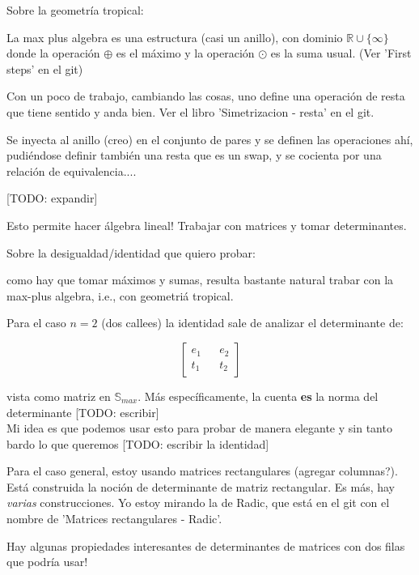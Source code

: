 \documentclass[10pt,a4paper]{report}
\begin{document}
Sobre la geometría tropical:

La max plus algebra es una estructura (casi un anillo), con dominio $\mathbb{R} \cup \{\infty\}$donde la operación $\oplus$ es el máximo y la operación $\odot$ es la suma usual. (Ver 'First steps' en el git)

Con un poco de trabajo, cambiando las cosas, uno define una operación de resta que tiene sentido y anda bien. Ver el libro 'Simetrizacion - resta' en el git.

Se inyecta al anillo (creo) en el conjunto de pares y se definen las operaciones ahí, pudiéndose definir también una resta que es un swap, y se cocienta por una relación de equivalencia....

[TODO: expandir]


Esto permite hacer álgebra lineal! Trabajar con matrices y tomar determinantes.



Sobre la desigualdad/identidad que quiero probar:

como hay que tomar máximos y sumas, resulta bastante natural trabar con la max-plus algebra, i.e., con geometriá tropical.


Para el caso $n=2$ (dos callees) la identidad sale de analizar el determinante de:

\[
\begin{bmatrix}
e_1 && e_2\\
t_1 && t_2
\end{bmatrix}
\]

vista como matriz en $\mathbb{S}_{max}$. Más específicamente, la cuenta \textbf{es} la norma del determinante [TODO: escribir] \\


Mi idea es que podemos usar esto para probar de manera elegante y sin tanto bardo lo que queremos [TODO: escribir la identidad] \bigskip


Para el caso general, estoy usando matrices rectangulares (agregar columnas?). Está construida la noción de determinante de matriz rectangular. Es más, hay \textit{varias} construcciones. Yo estoy mirando la de Radic, que está en el git con el nombre de 'Matrices rectangulares - Radic'.

Hay algunas propiedades interesantes de determinantes de matrices con dos filas que podría usar!
\end{document}
